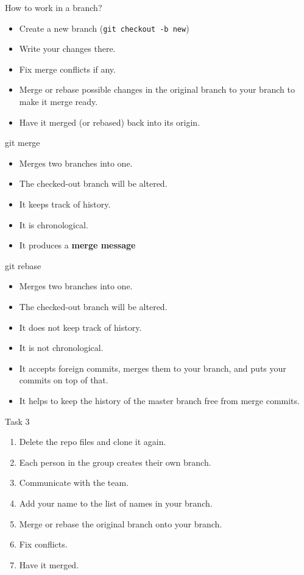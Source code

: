 \documentclass[14pt]{beamer}
\begin{document}
	\begin{frame}{How to work in a branch?}
	\begin{itemize}
		\item Create a new branch (\texttt{git checkout -b new})
		\item Write your changes there.
		\item Fix merge conflicts if any.
		\item Merge or rebase possible changes in the original branch to your branch to make it merge ready.
		\item Have it merged (or rebased) back into its origin.
	\end{itemize}
\end{frame}

	\begin{frame}{git merge}
	\begin{itemize}
		\item Merges two branches into one.
		\item The checked-out branch will be altered.
		\item It keeps track of history.
		\item It is chronological.
		\item It produces a \textbf{merge message}
	\end{itemize}
\end{frame}

	\begin{frame}{git rebase}
	\begin{itemize}
		\item Merges two branches into one.
		\item The checked-out branch will be altered.
		\item It does not keep track of history.
		\item It is not chronological.
		\item It accepts foreign commits, merges them to your branch, and puts your commits on top of that.
		\item It helps to keep the history of the master branch free from merge commits.
	\end{itemize}
\end{frame}


	\begin{frame}{Task 3}
	\begin{enumerate}
		\item Delete the repo files and clone it again.
		\item Each person in the group creates their own branch.
		\item Communicate with the team.
		\item Add your name to the list of names in your branch.
		\item Merge or rebase the original branch onto your branch.
		\item Fix conflicts.
		\item Have it merged.
	\end{enumerate}
	\end{frame}
\end{document}
